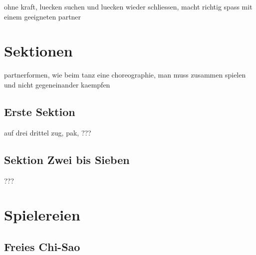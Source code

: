 ohne kraft, luecken suchen und luecken wieder schliessen, macht richtig spass mit einem geeigneten partner


\section{Sektionen}

partnerformen, wie beim tanz eine choreographie, man muss zusammen spielen und nicht gegeneinander kaempfen

\subsection{Erste Sektion}

auf drei drittel
zug, pak, ???

\subsection{Sektion Zwei bis Sieben}

???

\section{Spielereien}

\subsection{Freies Chi-Sao}


